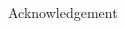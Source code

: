 \documentclass[xcolor=dvipsnames]{beamer} %
\begin{document}
\begin{frame}{}
\begin{columns}[t]
\begin{column}{.3\linewidth}
\begin{block} {\LARGE Acknowledgement}
    
\end{block}



  \end{column}
  


\end{columns}

\end{frame}
\end{document}
